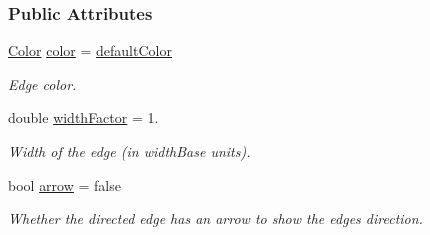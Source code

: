 \subsubsection*{Public Attributes}
\begin{DoxyCompactItemize}
\item 
\hyperlink{namespaceslb_1_1core_1_1util_afae144e1a65658559242f5cf4fce426f}{Color} \hyperlink{structslb_1_1core_1_1ui_1_1EdgeStyle_a651b7ec3c906e418f4d70c58cb280ca5}{color} = \hyperlink{structslb_1_1core_1_1ui_1_1EdgeStyle_a11590a49462e609a2fa986453f229fb7}{default\+Color}\hypertarget{structslb_1_1core_1_1ui_1_1EdgeStyle_a651b7ec3c906e418f4d70c58cb280ca5}{}\label{structslb_1_1core_1_1ui_1_1EdgeStyle_a651b7ec3c906e418f4d70c58cb280ca5}

\begin{DoxyCompactList}\small\item\em Edge color. \end{DoxyCompactList}\item 
double \hyperlink{structslb_1_1core_1_1ui_1_1EdgeStyle_a43492a2e8cee92017e7f9bfd6f3d0c26}{width\+Factor} = 1.\hypertarget{structslb_1_1core_1_1ui_1_1EdgeStyle_a43492a2e8cee92017e7f9bfd6f3d0c26}{}\label{structslb_1_1core_1_1ui_1_1EdgeStyle_a43492a2e8cee92017e7f9bfd6f3d0c26}

\begin{DoxyCompactList}\small\item\em Width of the edge (in width\+Base units). \end{DoxyCompactList}\item 
bool \hyperlink{structslb_1_1core_1_1ui_1_1EdgeStyle_a16f86f80c24bd2c1941114a352424d55}{arrow} = false\hypertarget{structslb_1_1core_1_1ui_1_1EdgeStyle_a16f86f80c24bd2c1941114a352424d55}{}\label{structslb_1_1core_1_1ui_1_1EdgeStyle_a16f86f80c24bd2c1941114a352424d55}

\begin{DoxyCompactList}\small\item\em Whether the directed edge has an arrow to show the edge\textquotesingle{}s direction. \end{DoxyCompactList}\end{DoxyCompactItemize}
